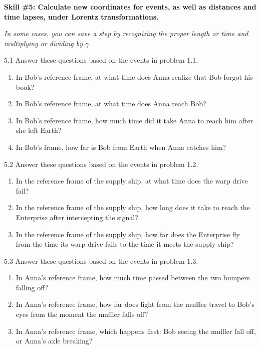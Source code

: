 \pagebreak

\textbf{Skill \#5: Calculate new coordinates for events, as well as distances and time lapses, under Lorentz transformations.}

\textit{In some cases, you can save a step by recognizing the proper length or time and multiplying or dividing by $\gamma$.}

5.1 Answer these questions based on the events in problem 1.1.
\begin{enumerate}[nosep,label=(\emph{\alph*})]
\item In Bob's reference frame, at what time does Anna realize that Bob forgot his book?
\answerspace{0.3in}

\item In Bob's reference frame, at what time does Anna reach Bob?
\answerspace{0.3in}

\item In Bob's reference frame, how much time did it take Anna to reach him after she left Earth?
\answerspace{0.3in}

\item In Bob's frame, how far is Bob from Earth when Anna catches him?
\answerspace{0.3in}

\end{enumerate}

5.2 Answer these questions based on the events in problem 1.2.
\begin{enumerate}[nosep,label=(\emph{\alph*})]
\item In the reference frame of the supply ship, at what time does the warp drive fail?
\answerspace{0.3in}

\item In the reference frame of the supply ship, how long does it take to reach the Enterprise after intercepting the signal?
\answerspace{0.3in}

\item In the reference frame of the supply ship, how far does the Enterprise fly from the time its warp drive fails to the time it meets the supply ship?
\answerspace{0.3in}
\end{enumerate}

5.3 Answer these questions based on the events in problem 1.3.
\begin{enumerate}[nosep,label=(\emph{\alph*})]
\item In Anna's reference frame, how much time passed between the two bumpers falling off?
\answerspace{0.3in}

\item In Anna's reference frame, how far does light from the muffler travel to Bob's eyes from the moment the muffler falls off?
\answerspace{0.3in}

\item In Anna's reference frame, which happens first: Bob seeing the muffler fall off, or Anna's axle breaking?
\answerspace{0.3in}

\end{enumerate}

